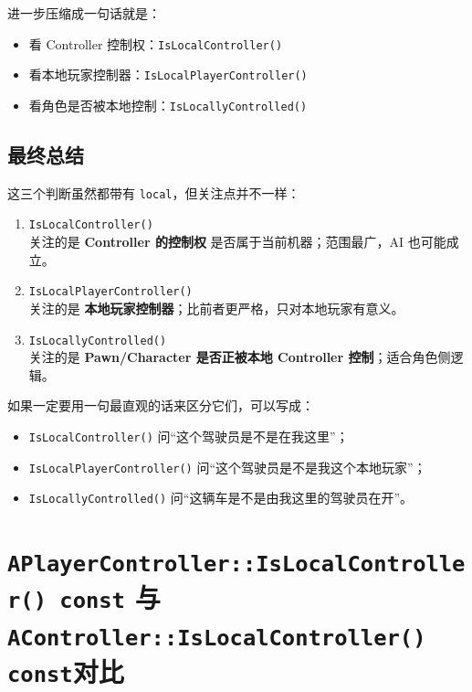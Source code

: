 进一步压缩成一句话就是：

\begin{itemize}
	\item 看 Controller 控制权：\texttt{IsLocalController()}
	\item 看本地玩家控制器：\texttt{IsLocalPlayerController()}
	\item 看角色是否被本地控制：\texttt{IsLocallyControlled()}
\end{itemize}

\subsection{最终总结}

这三个判断虽然都带有 \texttt{local}，但关注点并不一样：

\begin{enumerate}
	\item \texttt{IsLocalController()}\\
	关注的是 \textbf{Controller 的控制权} 是否属于当前机器；范围最广，AI 也可能成立。
	
	\item \texttt{IsLocalPlayerController()}\\
	关注的是 \textbf{本地玩家控制器}；比前者更严格，只对本地玩家有意义。
	
	\item \texttt{IsLocallyControlled()}\\
	关注的是 \textbf{Pawn/Character 是否正被本地 Controller 控制}；适合角色侧逻辑。
\end{enumerate}

如果一定要用一句最直观的话来区分它们，可以写成：

\begin{itemize}
	\item \texttt{IsLocalController()} 问“这个驾驶员是不是在我这里”；\\
	\item \texttt{IsLocalPlayerController()} 问“这个驾驶员是不是我这个本地玩家”；\\
	\item \texttt{IsLocallyControlled()} 问“这辆车是不是由我这里的驾驶员在开”。
\end{itemize}



\section{\texttt{APlayerController::IsLocalController() const} 与\\ \texttt{AController::IsLocalController() const}对比}

